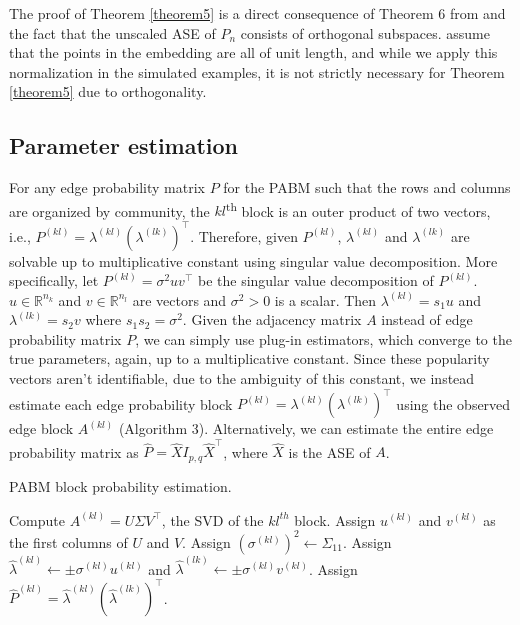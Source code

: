 \documentclass[12pt]{article}
\begin{document}
\begin{remark}
The proof of Theorem \ref{theorem5} is a direct consequence of Theorem 6
from  \citeauthor{jmlr-v28-wang13} and the fact that the unscaled ASE of
$P_n$ consists of orthogonal subspaces. \citeauthor{jmlr-v28-wang13} assume
that the points in the embedding are all of unit length, and while we apply
this normalization in the simulated examples, it is not strictly necessary
for Theorem \ref{theorem5} due to orthogonality.
\end{remark}

\hypertarget{parameter-estimation}{%
\subsection{Parameter estimation}\label{parameter-estimation}}

For any edge probability matrix \(P\) for the PABM such that the rows
and columns are organized by community, the \(kl\)\textsuperscript{th}
block is an outer product of two vectors, i.e.,
\(P^{(kl)} = \lambda^{(kl)} (\lambda^{(lk)})^\top\). Therefore, given
\(P^{(kl)}\), \(\lambda^{(kl)}\) and \(\lambda^{(lk)}\) are solvable
up to multiplicative constant using singular value
decomposition. More specifically, let \(P^{(kl)} = \sigma^2 u v^\top\)
be the singular value decomposition of \(P^{(kl)}\).
\(u \in \mathbb{R}^{n_k}\) and \(v \in \mathbb{R}^{n_l}\) are vectors
and \(\sigma^2 > 0\) is a scalar. Then \(\lambda^{(kl)} = s_1 u\)
and \(\lambda^{(lk)} = s_2 v\) where $s_1 s_2 = \sigma^2$.
Given the adjacency matrix \(A\)
instead of edge probability matrix \(P\), we can simply use plug-in
estimators, which converge to the true parameters, again, up to a
multiplicative constant. Since these popularity vectors aren't identifiable,
due to the ambiguity of this constant,
we instead estimate each edge probability block
$P^{(kl)} = \lambda^{(kl)} (\lambda^{(lk)})^\top$
using the observed edge block $A^{(kl)}$ (Algorithm 3).
Alternatively, we can estimate the entire edge probability matrix as
$\hat{P} = \hat{X} I_{p,q} \hat{X}^\top$, where $\hat{X}$ is the ASE of $A$.

\begin{algorithm}[t]
  \DontPrintSemicolon
  \SetAlgoLined
  \caption{PABM block probability estimation.}
  Compute $A^{(kl)} = U \Sigma V^\top$, the SVD of the $kl^{th}$ block.\;
  Assign $u^{(kl)}$ and $v^{(kl)}$ as the first columns of $U$ and $V$.
  Assign $(\sigma^{(kl)})^2 \leftarrow \Sigma_{11}$.\;
  Assign $\hat{\lambda}^{(kl)} \leftarrow \pm \sigma^{(kl)} u^{(kl)}$ and
  $\hat{\lambda}^{(lk)} \leftarrow \pm \sigma^{(kl)} v^{(kl)}$.\;
  Assign $\hat{P}^{(kl)} = \hat{\lambda}^{(kl)} (\hat{\lambda}^{(lk)})^\top$.
\end{algorithm}
\end{document}
